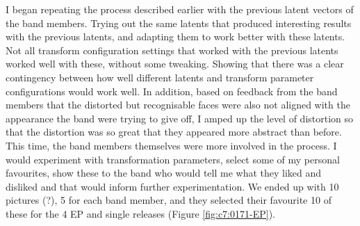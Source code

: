 I began repeating the process described earlier with the previous latent vectors of the band members. 
Trying out the same latents that produced interesting results with the previous latents, and adapting them to work better with these latents. 
Not all transform configuration settings that worked with the previous latents worked well with these, without some tweaking. 
Showing that there was a clear contingency between how well different latents and transform parameter configurations would work well.
In addition, based on feedback from the band members that the distorted but recognisable faces were also not aligned with the appearance the band were trying to give off, I amped up the level of distortion so that the distortion was so great that they appeared more abstract than before. 
This time, the band members themselves were more involved in the process. I would experiment with transformation parameters, select some of my personal favourites, show these to the band who would tell me what they liked and disliked and that would inform further experimentation. 
We ended up with 10 pictures (?), 5 for each band member, and they selected their favourite 10 of these for the 4 EP and single releases (Figure \ref{fig:c7:0171-EP}). 

